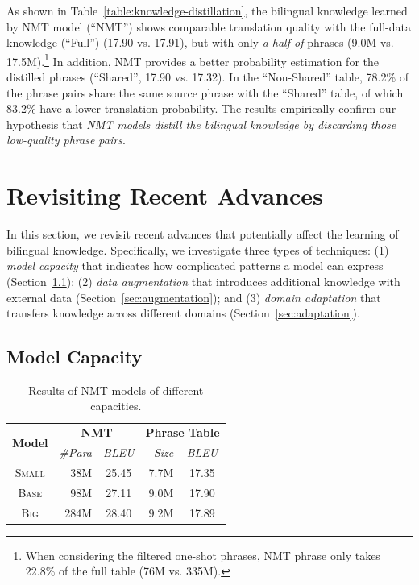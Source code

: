 \documentclass[11pt,a4paper]{article}
\begin{document}
As shown in Table~\ref{table:knowledge-distillation}, the bilingual knowledge learned by NMT model (``NMT'') shows comparable translation quality with the full-data knowledge (``Full'') (17.90 vs. 17.91), but with only {\em a half of } phrases (9.0M vs. 17.5M).\footnote{When considering the filtered one-shot phrases, NMT phrase only takes 22.8\% of the full table (76M vs. 335M).}
In addition, NMT provides a better probability estimation for the distilled phrases (``Shared'', 17.90 vs. 17.32). In the ``Non-Shared'' table, 78.2\% of the phrase pairs share the same source phrase with the ``Shared'' table, of which 83.2\% have a lower translation probability. The results empirically confirm our hypothesis that {\em NMT models distill the bilingual knowledge by discarding those low-quality phrase pairs}.


\section{Revisiting Recent Advances}
\label{sec:application}


In this section, we revisit recent advances that potentially affect the learning of bilingual knowledge. Specifically, we investigate three types of techniques: (1) {\em model capacity} that indicates how complicated patterns a model can express (Section~\ref{sec:capacity}); (2) {\em data augmentation} that introduces additional knowledge with external data (Section~\ref{sec:augmentation}); and (3) {\em domain adaptation} that transfers knowledge across different domains (Section~\ref{sec:adaptation}).



\subsection{Model Capacity }
\label{sec:capacity}


\begin{table}[t]
  \centering
  \begin{tabular}{c||r|c||r|c}
  \multirow{2}{*}{\bf Model}  &
  \multicolumn{2}{c||}{\bf NMT} &
  \multicolumn{2}{c}{\bf Phrase Table} \\
  \cline{2-5}
     & \em {\#Para}  & \em  BLEU & \em Size & \em BLEU\\
  \hline
  \textsc{Small} & 38M   & 25.45  & 7.7M & 17.35\\  %
  \textsc{Base}  & 98M   & 27.11 &  9.0M & 17.90 \\
  \textsc{Big}   & 284M  & 28.40 &  9.2M & 17.89 \\
    \end{tabular}
  \caption{Results of NMT models of different capacities.}
  \label{tab:capacity}
\end{table}
\end{document}
